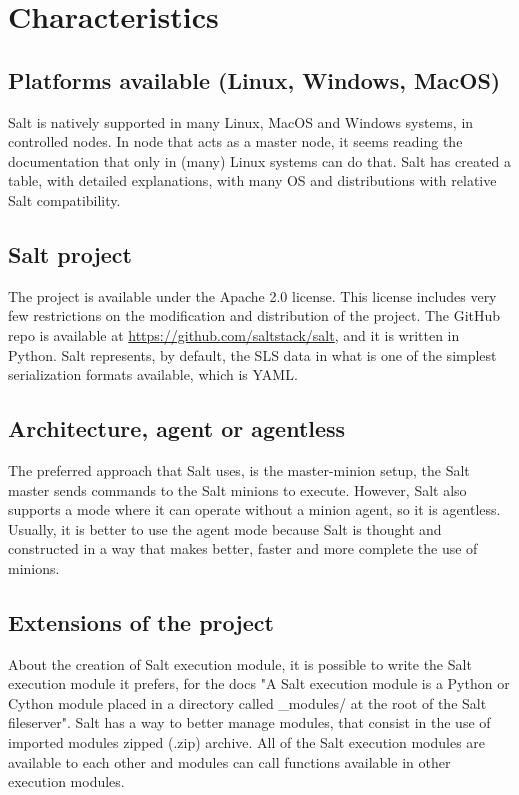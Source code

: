 \documentclass[12pt,a4paper,openright,twoside]{book}
\begin{document}
\section{Characteristics}

\subsection{Platforms available (Linux, Windows, MacOS)}
Salt is natively supported in many Linux, MacOS and Windows systems, in controlled nodes.
In node that acts as a master node, it seems reading the documentation that only in (many) Linux systems can do that.
Salt has created a table, with detailed explanations, with many OS and distributions with relative Salt compatibility\cite{saltDocTable}.

\subsection{Salt project}
The project is available under the Apache 2.0 license. This license includes very few restrictions on the modification and distribution of the project.
The GitHub repo is available at \url{https://github.com/saltstack/salt}, and it is written in Python.
Salt represents, by default, the SLS data in what is one of the simplest serialization formats available, which is YAML.

\subsection{Architecture, agent or agentless}
The preferred approach that Salt uses, is the master-minion setup, the Salt master sends commands to the Salt minions to execute.
However, Salt also supports a mode where it can operate without a minion agent, so it is agentless.
Usually, it is better to use the agent mode because Salt is thought and constructed in a way that makes better, faster and more complete the use of minions.

\subsection{Extensions of the project}
About the creation of Salt execution module, it is possible to write the Salt execution module it prefers,
for the docs "A Salt execution module is a Python or Cython module
placed in a directory called \_modules/ at the root of the Salt fileserver".\cite{saltDocModules}
Salt has a way to better manage modules, that consist in the use of imported modules zipped (.zip) archive.
All of the Salt execution modules are available to each other and modules can call functions available in other execution modules.
\end{document}
